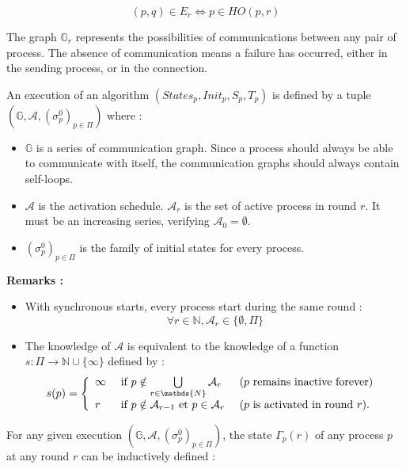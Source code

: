 \documentclass{article}
\begin{document}
$$(p, q) \in E_r \Leftrightarrow p \in HO(p, r)$$

The graph $\mathds{G}_r$ represents the possibilities of communications between any pair of process.
The absence of communication means a failure has occurred, either in the sending process, or in the connection.

An execution of an algorithm $(States_p, Init_p, S_p, T_p)$ is defined by a tuple
$(\mathds{G}, \mathcal{A}, (\sigma^0_p)_{p \in \Pi})$ where :

\begin{itemize}
	\item $\mathds{G}$ is a series of communication graph. Since a process should always be able to communicate 
		with itself, the communication graphs should always contain self-loops.
	\item $\mathcal{A}$ is the activation schedule. $\mathcal{A}_r$ is the set of active process in round $r$.
		It must be an increasing series, verifying $\mathcal{A}_0 = \emptyset$.
	\item $(\sigma^0_p)_{p \in \Pi}$ is the family of initial states for every process.
\end{itemize}

\textbf{Remarks :}

\begin{itemize}
	\item With synchronous starts, every process start during the same round : 
		$$\forall r \in \mathds{N}, \mathcal{A}_r \in \{\emptyset, \Pi\}$$

	\item The knowledge of $\mathcal{A}$ is equivalent to the knowledge of a function
		$s : \Pi \rightarrow \mathds{N} \cup \{\infty\}$ defined by :
		$$s(p) = \left \{ \begin{array}{l ll}
		  \infty & \mbox{ if  } p \notin \bigcup\limits_{r \in \mathds{N}}  \mathcal{A}_r & 
			  \mbox { ($p$ remains inactive forever) } \\
		  r  & \mbox{ if  } p \notin \mathcal{A}_{r-1} \mbox{ et } p \in \mathcal{A}_{r}  &
			  \mbox{ ($p$ is activated in round $r$)}.
		  \end{array} \right.$$

\end{itemize}

For any given execution $(\mathds{G}, \mathcal{A}, (\sigma^0_p)_{p \in \Pi})$,
the state $\Gamma_p(r)$ of any process $p$ at any round $r$ can be inductively defined :
\end{document}
